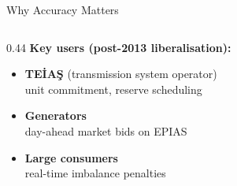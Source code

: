\documentclass[10pt,aspectratio=169]{beamer}
\begin{document}
\begin{frame}{Why Accuracy Matters}
  \begin{columns}
    \begin{column}{0.44\textwidth}
      \textbf{Key users (post-2013 liberalisation):}
      \vspace{0.3em}
      \begin{itemize}
        \item \textbf{TEİAŞ} (transmission system operator)\\
              {\small unit commitment, reserve scheduling}
        \item \textbf{Generators}\\
              {\small day-ahead market bids on EPIAS}
        \item \textbf{Large consumers}\\
              {\small real-time imbalance penalties}
      \end{itemize}


\end{column}
\end{columns}
\end{frame}
\end{document}
